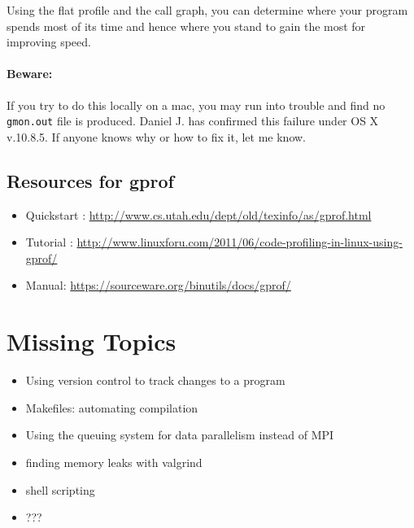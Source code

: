 \documentclass[letterpaper,12pt]{article}
\begin{document}
Using the flat profile and the call graph, you can determine where your program spends most of its time and hence where you stand to gain the most for improving speed.

\paragraph{Beware:} If you try to do this locally on a mac, you may run into trouble and find no \texttt{gmon.out} file is produced. Daniel J. has confirmed this failure under OS X v.10.8.5. If anyone knows why or how to fix it, let me know.

\subsection*{Resources for gprof}
\begin{itemize}
\item Quickstart : \url{http://www.cs.utah.edu/dept/old/texinfo/as/gprof.html}
\item Tutorial : \url{http://www.linuxforu.com/2011/06/code-profiling-in-linux-using-gprof/}
\item Manual: \url{https://sourceware.org/binutils/docs/gprof/}
\end{itemize}

\section{Missing Topics}
\begin{itemize}
\item Using version control to track changes to a program
\item Makefiles: automating compilation
\item Using the queuing system for data parallelism instead of MPI
\item finding memory leaks with valgrind
\item shell scripting
\item ???
\end{itemize}



\end{document}
